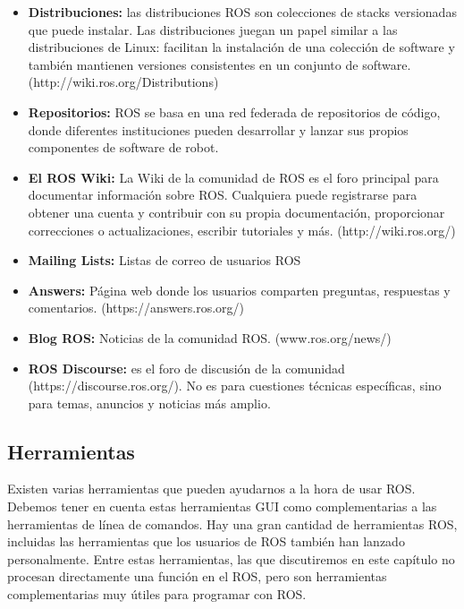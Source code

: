             \begin{itemize}
                \item {\textbf{Distribuciones:} las distribuciones ROS son colecciones de stacks versionadas que puede instalar. Las distribuciones juegan un papel similar a las distribuciones de Linux: facilitan la instalación de una colección de software y también mantienen versiones consistentes en un conjunto de software. (http://wiki.ros.org/Distributions)}
                \item {\textbf{Repositorios:} ROS se basa en una red federada de repositorios de código, donde diferentes instituciones pueden desarrollar y lanzar sus propios componentes de software de robot. }
                \item {\textbf{El ROS Wiki:} La Wiki de la comunidad de ROS es el foro principal para documentar información sobre ROS. Cualquiera puede registrarse para obtener una cuenta y contribuir con su propia documentación, proporcionar correcciones o actualizaciones, escribir tutoriales y más. (http://wiki.ros.org/) }
                \item {\textbf{Mailing Lists:} Listas de correo de usuarios ROS}
                \item {\textbf{Answers:} Página web donde los usuarios comparten preguntas, respuestas y comentarios. (https://answers.ros.org/) }
                \item {\textbf{Blog ROS:} Noticias de la comunidad ROS. (www.ros.org/news/)  }
                \item {\textbf{ROS Discourse:} es el foro de discusión de la comunidad (https://discourse.ros.org/). No es para cuestiones técnicas específicas, sino para temas, anuncios y noticias más amplio.}
            \end{itemize}
            
            
            
            
               \newpage
               
    \newpage

    \subsection{Herramientas}
    
        Existen varias herramientas que pueden ayudarnos a la hora de usar ROS. Debemos tener en cuenta estas herramientas GUI como complementarias a las herramientas de línea de comandos. Hay una gran cantidad de herramientas ROS, incluidas las herramientas que los usuarios de ROS también han lanzado personalmente. Entre estas herramientas, las que discutiremos en este capítulo no procesan directamente una función en el ROS, pero son herramientas complementarias muy útiles para programar con ROS.
            
